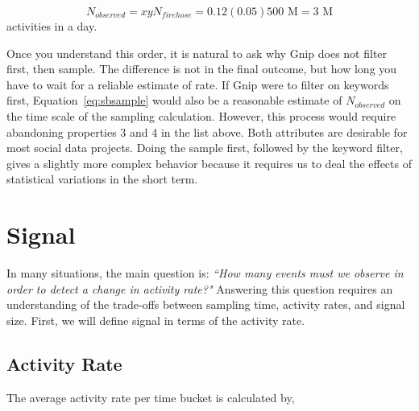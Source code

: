\documentclass{article}
\begin{document}
\begin{equation}
    \label{eq:sbsample}
    N_{observed} = x y N_{firehose}= 0.12 (0.05) 500 \textrm{ M} = 3 \textrm{ M}
\end{equation}
activities in a day. 

Once you understand this order, it is natural to ask why Gnip does not filter first, then sample. The difference is not
in the final outcome, but how long you have to wait for a reliable estimate of rate. If Gnip were to filter on keywords
first, Equation~\ref{eq:sbsample} would also be a reasonable estimate of $N_{observed}$ on the time scale of the 
sampling calculation. However, this process would require abandoning properties 3 and 4 in the list above. Both attributes
are desirable for most social data projects. Doing the sample first, followed by the keyword filter, gives a slightly
more complex behavior because it requires us to deal the effects of statistical variations in the short term.

\section{Signal} 

In many situations, the main question is: \emph{``How many events must we observe in order to detect a change in activity rate?"} Answering
this question requires an understanding of the trade-offs between sampling time, activity rates, and signal size.  First, 
we will define signal in terms of the activity rate.


\subsection{Activity Rate} 



\medskip
The\reversemarginpar\marginpar{\raggedleft
%
    \begin{tikzpicture}[scale=0.26]]
\draw [red, very thick, rotate around={60: (0, 0)}] (-0.7, -0.7) rectangle(0.7, 0.7);
%
\draw [very thick, <->] (0.25000000000000006, 0.4330127018922193) -- (1.25, 2.165063509461097) ;
\draw [very thick, <->] (1.75, 2.165063509461097) -- (2.75, 0.4330127018922193) ;
\draw [very thick, <->] (2.5, 0) -- (0.5, 0) ;
%
\draw [orange, ultra thick] (0,0) circle [radius= 0.5 ];
\draw [yellow, ultra thick] ( 1.5 , 2.59807621135 ) circle [radius= 0.5 ];
\draw [green,  ultra thick] ( 3.0 , 0 ) circle [radius= 0.5 ];
    \end{tikzpicture}
%
%
} average activity rate per time bucket is calculated by,
\end{document}
